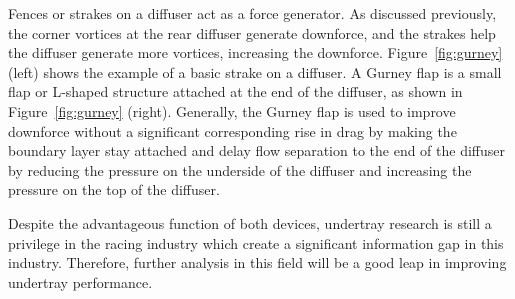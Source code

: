\noindent Fences or strakes on a diffuser act as a force generator. As discussed previously, the corner vortices at the rear diffuser generate downforce, and the strakes help the diffuser generate more vortices, increasing the downforce. Figure~\ref{fig:gurney} (left) shows the example of a basic strake on a diffuser. A Gurney flap is a small flap or L-shaped structure attached at the end of the diffuser, as shown in Figure~\ref{fig:gurney} (right). Generally, the Gurney flap is used to improve downforce without a significant corresponding rise in drag \cite{Willemsen2012CFD-basedDiffuser} by making the boundary layer stay attached and delay flow separation to the end of the diffuser by reducing the pressure on the underside of the diffuser and increasing the pressure on the top of the diffuser. 

\noindent Despite the advantageous function of both devices, undertray research is still a privilege in the racing industry which create a significant information gap in this industry. Therefore, further analysis in this field will be a good leap in improving undertray performance.  
